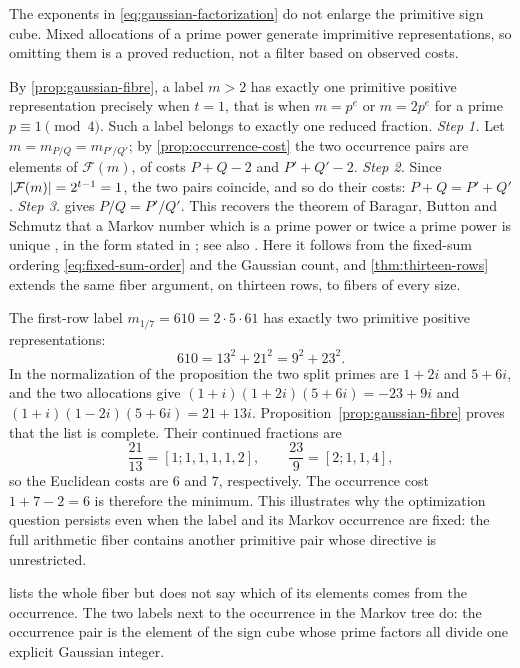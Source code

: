 The exponents in \eqref{eq:gaussian-factorization} do not enlarge the
primitive sign cube. Mixed allocations of a prime power generate
imprimitive representations, so omitting them is a proved reduction,
not a filter based on observed costs.

\begin{remark}\label{rem:single-representation}
By \cref{prop:gaussian-fibre}, a label $m>2$ has exactly one primitive
positive representation precisely when $t=1$, that is when $m=p^e$ or
$m=2p^e$ for a prime $p\equiv1\pmod4$. Such a label belongs to exactly one
reduced fraction. \emph{Step 1.} Let $m=m_{P/Q}=m_{P'/Q'}$; by
\cref{prop:occurrence-cost} the two occurrence pairs are elements of
$\mathcal F(m)$, of costs $P+Q-2$ and $P'+Q'-2$. \emph{Step 2.} Since
$\lvert\mathcal F(m)\rvert=2^{t-1}=1$, the two pairs coincide, and so do their
costs: $P+Q=P'+Q'$. \emph{Step 3.}  gives
$P/Q=P'/Q'$. This recovers the theorem of Baragar, Button and Schmutz that a
Markov number which is a prime power or twice a prime power is unique
\cite{Baragar1996,Button1998,Schmutz1996}, in the form stated in
\cite[Theorem~C]{Zhang2007}; see also \cite{LangTan2007}. Here it follows
from the fixed-sum ordering \eqref{eq:fixed-sum-order} and the Gaussian
count, and \cref{thm:thirteen-rows} extends the same fiber argument, on
thirteen rows, to fibers of every size.
\end{remark}

\begin{example}
The first-row label $m_{1/7}=610=2\cdot5\cdot61$ has exactly two
primitive positive representations:
$$
 610=13^2+21^2=9^2+23^2.
$$
In the normalization of the proposition the two split primes are
$1+2i$ and $5+6i$, and the two allocations give
$(1+i)(1+2i)(5+6i)=-23+9i$ and $(1+i)(1-2i)(5+6i)=21+13i$. Proposition~\ref{prop:gaussian-fibre}
proves that the list is complete. Their continued fractions are
$$
 \frac{21}{13}=[1;1,1,1,1,2],\qquad
 \frac{23}{9}=[2;1,1,4],
$$
so the Euclidean costs are $6$ and $7$, respectively. The occurrence
cost $1+7-2=6$ is therefore the minimum. This illustrates why the
optimization question persists even when the label and its Markov
occurrence are fixed: the full arithmetic fiber contains another
primitive pair whose directive is unrestricted.
\end{example}

 lists the whole fiber but does not say which of
its elements comes from the occurrence. The two labels next to the
occurrence in the Markov tree do: the occurrence pair is the element of the
sign cube whose prime factors all divide one explicit Gaussian integer.

